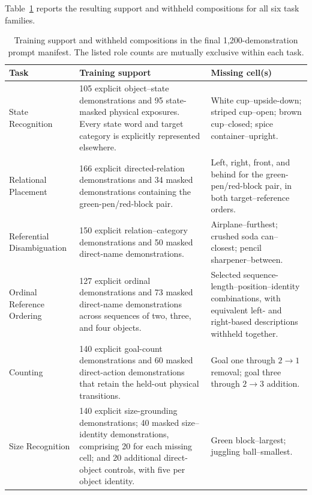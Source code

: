 

Table~\ref{tab:held_out_design} reports the resulting support and withheld compositions for all six task families.

\begin{table}[t]
\centering
\small
\caption{Training support and withheld compositions in the final 1,200-demonstration prompt manifest. The listed role counts are mutually exclusive within each task.}
\label{tab:held_out_design}
\begin{tabular}{p{} p{} p{}}
\toprule
\textbf{Task} & \textbf{Training support} & \textbf{Missing cell(s)} \\
\midrule
State Recognition
& 105 explicit object--state demonstrations and 95 state-masked physical exposures. Every state word and target category is explicitly represented elsewhere.
& White cup--upside-down; striped cup--open; brown cup--closed; spice container--upright. \\

Relational Placement
& 166 explicit directed-relation demonstrations and 34 masked demonstrations containing the green-pen/red-block pair.
& Left, right, front, and behind for the green-pen/red-block pair, in both target--reference orders. \\

Referential Disambiguation
& 150 explicit relation--category demonstrations and 50 masked direct-name demonstrations.
& Airplane--furthest; crushed soda can--closest; pencil sharpener--between. \\

Ordinal Reference Ordering
& 127 explicit ordinal demonstrations and 73 masked direct-name demonstrations across sequences of two, three, and four objects.
& Selected sequence-length--position--identity combinations, with equivalent left- and right-based descriptions withheld together. \\

Counting
& 140 explicit goal-count demonstrations and 60 masked direct-action demonstrations that retain the held-out physical transitions.
& Goal one through $2\rightarrow1$ removal; goal three through $2\rightarrow3$ addition. \\

Size Recognition
& 140 explicit size-grounding demonstrations; 40 masked size--identity demonstrations, comprising 20 for each missing cell; and 20 additional direct-object controls, with five per object identity.
& Green block--largest; juggling ball--smallest. \\
\bottomrule
\end{tabular}
\end{table}

